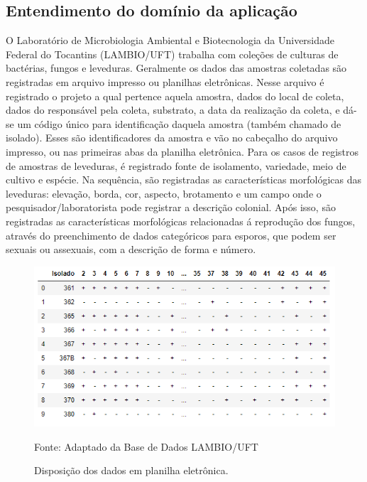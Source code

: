 \documentclass[tcc2]{classe_uftex/uftex}
\begin{document}
\subsection{Entendimento do domínio da aplicação}
\label{subsec:entendimento_dominio}
O Laboratório de Microbiologia Ambiental e Biotecnologia da Universidade Federal do Tocantins (LAMBIO/UFT) trabalha com coleções de culturas de bactérias, fungos e leveduras. Geralmente os dados das amostras coletadas são registradas em arquivo impresso ou planilhas eletrônicas. Nesse arquivo é registrado o projeto a qual pertence aquela amostra, dados do local de coleta, dados do responsável pela coleta, substrato, a data da realização da coleta, e dá-se um código único para identificação daquela amostra (também chamado de isolado). Esses são identificadores da amostra e vão no cabeçalho do arquivo impresso, ou nas primeiras abas da planilha eletrônica. Para os casos de registros de amostras de leveduras, é registrado fonte de isolamento, variedade, meio de cultivo e espécie. Na sequência, são registradas as características morfológicas das leveduras: elevação, borda, cor, aspecto, brotamento e um campo onde o pesquisador/laboratorista pode registrar a descrição colonial. Após isso, são registradas as características morfológicas relacionadas á reprodução dos fungos, através do preenchimento de dados categóricos para esporos, que podem ser sexuais ou assexuais, com a descrição de forma e número.

    \begin{figure}[ht]
    \centering
      \includegraphics[scale=0.9]{TCC_Johnny/img/reacao_composto.PNG}
      \caption{Disposição dos dados em planilha eletrônica.}
      \raggedright \scriptsize \centering Fonte: Adaptado da Base de Dados LAMBIO/UFT
      \label{fig:fig008}
    \end{figure}
\end{document}
